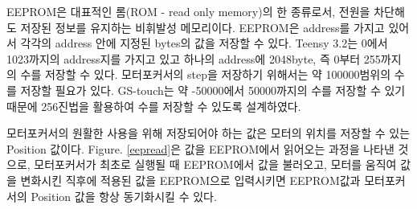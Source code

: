 EEPROM은 대표적인 롬(ROM - read only memory)의 한 종류로서, 전원을 차단해도 저장된 정보를 유지하는 비휘발성 메모리이다. EEPROM은 address를 가지고 있어서 각각의 address 안에 지정된 bytes의 값을 저장할 수 있다. Teensy 3.2는 0에서 1023까지의 address지를 가지고 있고 하나의 address에 2048byte, 즉 0부터 255까지의 수를 저장할 수 있다. 모터포커서의 step을 저장하기 위해서는 약 100000범위의 수를 저장할 필요가 있다. GS-touch는 약 -50000에서 50000까지의 수를 저장할 수 있기 때문에 256진법을 활용하여 수를 저장할 수 있도록 설계하였다.


 모터포커서의 원활한 사용을 위해 저장되어야 하는 값은 모터의 위치를 저장할 수 있는 Position 값이다. \textrm{Figure}. \ref{eepread}은 값을 EEPROM에서 읽어오는 과정을 나타낸 것으로, 모터포커서가 최초로 실행될 때 EEPROM에서 값을 불러오고, 모터를 움직여 값을 변화시킨 직후에 적용된 값을 EEPROM으로 입력시키면 EEPROM값과 모터포커서의 Position 값을 항상 동기화시킬 수 있다.


